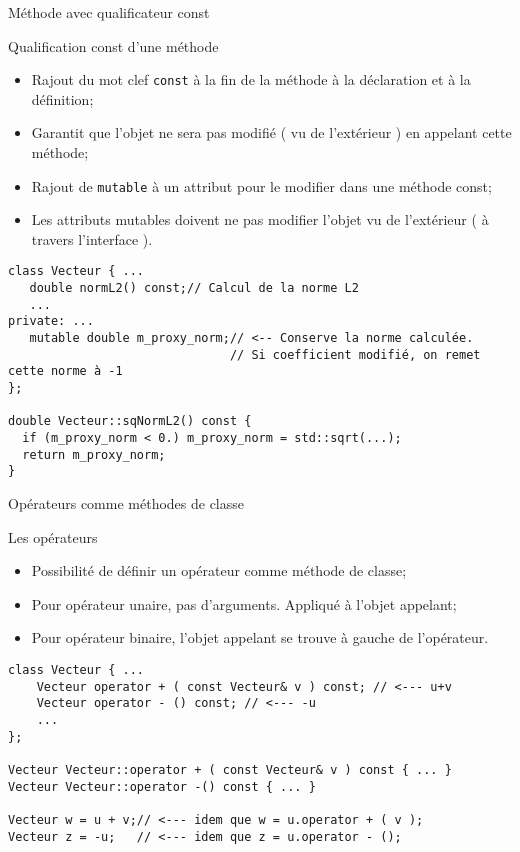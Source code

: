 \documentclass[handout,10pt]{beamer}
\begin{document}
\begin{frame}[fragile]{Méthode avec qualificateur const}
\begin{block}{Qualification const d'une méthode}
\begin{itemize}
\item Rajout du mot clef \lstinline{const} à la fin de la méthode à la déclaration et à la définition;
\item Garantit que l'objet ne sera pas modifié ( vu de l'extérieur ) en appelant cette méthode;
\item Rajout de \lstinline{mutable} à un attribut pour le modifier dans une méthode const;
\item Les attributs mutables doivent ne pas modifier l'objet vu de l'extérieur ( à travers l'interface ).
\end{itemize}
\end{block}
\begin{lstlisting}
class Vecteur { ...
   double normL2() const;// Calcul de la norme L2
   ...
private: ...
   mutable double m_proxy_norm;// <-- Conserve la norme calculée. 
                               // Si coefficient modifié, on remet cette norme à -1
};

double Vecteur::sqNormL2() const {
  if (m_proxy_norm < 0.) m_proxy_norm = std::sqrt(...);
  return m_proxy_norm;
}
\end{lstlisting}
\end{frame}

\begin{frame}[fragile]{Opérateurs comme méthodes de classe}
\begin{block}{Les opérateurs}
\begin{itemize}
\item Possibilité de définir un opérateur comme méthode de classe;
\item Pour opérateur unaire, pas d'arguments. Appliqué à l'objet appelant;
\item Pour opérateur binaire, l'objet appelant se trouve à gauche de l'opérateur.
\end{itemize}
\end{block}

\begin{lstlisting}
class Vecteur { ...
    Vecteur operator + ( const Vecteur& v ) const; // <--- u+v
    Vecteur operator - () const; // <--- -u
    ...
};

Vecteur Vecteur::operator + ( const Vecteur& v ) const { ... }
Vecteur Vecteur::operator -() const { ... }

Vecteur w = u + v;// <--- idem que w = u.operator + ( v );
Vecteur z = -u;   // <--- idem que z = u.operator - ();
\end{lstlisting}
\end{frame}
\end{document}
